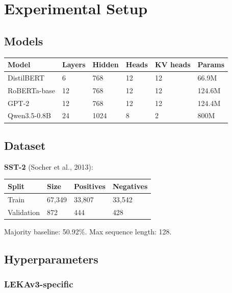 \section{Experimental Setup}

\subsection{Models}

\begin{table}[H]
\centering
\small
\begin{tabular}{llllll}
\toprule
\textbf{Model} & \textbf{Layers} & \textbf{Hidden} & \textbf{Heads} & \textbf{KV heads} & \textbf{Params} \\
\midrule
DistilBERT & 6 & 768 & 12 & 12 & 66.9M \\
RoBERTa-base & 12 & 768 & 12 & 12 & 124.6M \\
GPT-2 & 12 & 768 & 12 & 12 & 124.4M \\
Qwen3.5-0.8B & 24 & 1024 & 8 & 2 & 800M \\
\bottomrule
\end{tabular}
\end{table}

\subsection{Dataset}

\textbf{SST-2} (Socher et al., 2013):

\begin{table}[H]
\centering
\small
\begin{tabular}{llll}
\toprule
\textbf{Split} & \textbf{Size} & \textbf{Positives} & \textbf{Negatives} \\
\midrule
Train & 67,349 & 33,807 & 33,542 \\
Validation & 872 & 444 & 428 \\
\bottomrule
\end{tabular}
\end{table}

Majority baseline: 50.92\%. Max sequence length: 128.

\subsection{Hyperparameters}

\subsubsection{LEKAv3-specific}

